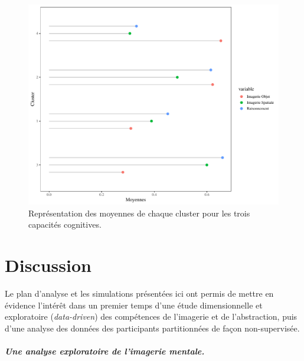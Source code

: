 \documentclass[
  12pt,
]{article}
\let\oldsubparagraph\subparagraph
\renewcommand{\subparagraph}[1]{\oldsubparagraph{#1}\mbox{}}
\begin{document}
\begin{figure}[h]

\includegraphics[width=\textwidth,height=0.5\textheight]{aphantasia_quarto_files/figure-pdf/lollipop-1.pdf}

\caption{Représentation des moyennes de chaque cluster pour les trois capacités cognitives.}
\label{lollipop}
\end{figure}

\hypertarget{discussion}{%
\section{Discussion}\label{discussion}}

Le plan d'analyse et les simulations présentées ici ont permis de mettre
en évidence l'intérêt dans un premier temps d'une étude dimensionnelle
et exploratoire (\emph{data-driven}) des compétences de l'imagerie et de
l'abstraction, puis d'une analyse des données des participants
partitionnées de façon non-supervisée.

\hypertarget{une-analyse-exploratoire-de-limagerie-mentale.}{%
\subparagraph{Une analyse exploratoire de l'imagerie
mentale.}\label{une-analyse-exploratoire-de-limagerie-mentale.}}
\end{document}
